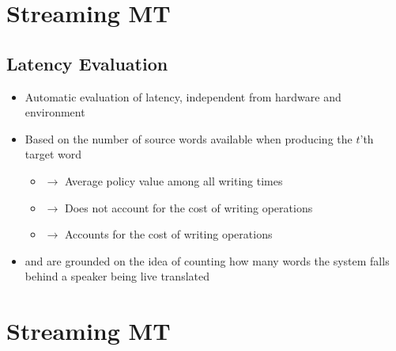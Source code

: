 \documentclass[landscape]{article}
\begin{document}
\cp
\section*{Streaming MT}
\vspace*{10mm}
\subsection*{Latency Evaluation}
\vspace*{5mm}
\begin{itemize}\itemsep=5mm
	\item Automatic evaluation of latency, independent from hardware and environment 
\vspace*{5mm}
    \item Based on the number of source words available when producing the $t$'th target word 
\vspace*{5mm}
	\begin{itemize}\itemsep=5mm
        \item {} $\to$ Average policy value among all writing times 
        \item {} $\to$ Does not account for the cost of writing operations     
        \item {} $\to$ Accounts for the cost of writing operations
	\end{itemize}
\vspace*{5mm}
    \item {} and  are grounded on the idea of counting how many words the system falls behind a speaker being live translated
\end{itemize}
\vspace*{2cm}


\cp
\section*{Streaming MT}
\vspace*{5mm}
\end{document}
